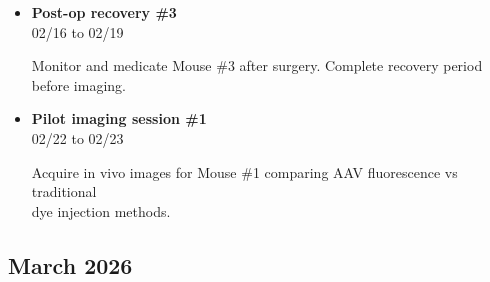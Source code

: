 \documentclass[landscape,a4paper]{article}
\begin{document}
\begin{itemize}[leftmargin=1cm, itemsep=0.8em]
    \item \textcolor{other}{\textbf{Post-op recovery \#3}}\\[0.2em]
          \textcolor{black!70}{\small 02/16 to 02/19}
\\[0.3em]
          \begin{minipage}[t]{0.85\textwidth}
          \textcolor{black!80}{Monitor and medicate Mouse \#3 after surgery. Complete recovery period before imaging.}
          \end{minipage}

    \item \textcolor{other}{\textbf{Pilot imaging session \#1}}\\[0.2em]
          \textcolor{black!70}{\small 02/22 to 02/23}
\\[0.3em]
          \begin{minipage}[t]{0.85\textwidth}
          \textcolor{black!80}{Acquire in vivo images for Mouse \#1 comparing AAV fluorescence vs traditional\\[0.1em]
          dye injection methods.}
          \end{minipage}

\end{itemize}

\subsection*{March 2026}
\vspace{0.5cm}
\end{document}
